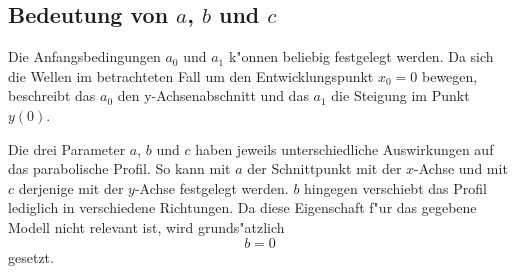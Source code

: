 \subsection{Bedeutung von \texorpdfstring{$a$}{a}, \texorpdfstring{$b$}{b} und 
	\texorpdfstring{$c$}{c}}

Die Anfangsbedingungen $a_0$ und $a_1$ k"onnen beliebig festgelegt werden. Da 
sich die Wellen im betrachteten Fall um den Entwicklungspunkt $x_0=0$ bewegen, 
beschreibt das $a_0$ den y-Achsenabschnitt und das $a_1$ die Steigung im Punkt 
$y(0)$.

Die drei Parameter $a$, $b$ und $c$ haben jeweils unterschiedliche Auswirkungen 
auf das parabolische Profil. So kann mit $a$ der Schnittpunkt mit der $x$-Achse 
und mit $c$ derjenige mit der $y$-Achse festgelegt werden. $b$ hingegen 
verschiebt das Profil lediglich in verschiedene Richtungen. Da diese 
Eigenschaft f"ur das gegebene Modell nicht relevant ist, wird grunds"atzlich
\begin{equation*}
	b = 0
\end{equation*}
gesetzt.